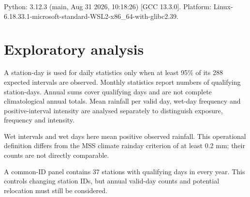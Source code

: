 \documentclass[11pt,a4paper]{article}
\begin{document}
\begin{table}[H]\centering\small
\caption{Local Spark runtime configuration}
\end{table}
Python: 3.12.3 (main, Aug 31 2026, 10:18:26) [GCC 13.3.0]. Platform: Linux-6.18.33.1-microsoft-standard-WSL2-x86\_64-with-glibc2.39.

\begin{table}[H]\centering\small
\caption{Measured stage elapsed times; preparation includes cleaning and exploratory aggregation.}
\end{table}
\section{Exploratory analysis}
A station-day is used for daily statistics only when at least 95\% of its 288 expected intervals are observed. Monthly statistics report numbers of qualifying station-days. Annual sums cover qualifying days and are not complete climatological annual totals. Mean rainfall per valid day, wet-day frequency and positive-interval intensity are analysed separately to distinguish exposure, frequency and intensity.

Wet intervals and wet days here mean positive observed rainfall. This operational definition differs from the MSS climate rainday criterion of at least 0.2 mm; their counts are not directly comparable.

A common-ID panel contains 37 stations with qualifying days in every year. This controls changing station IDs, but annual valid-day counts and potential relocation must still be considered.
\end{document}
